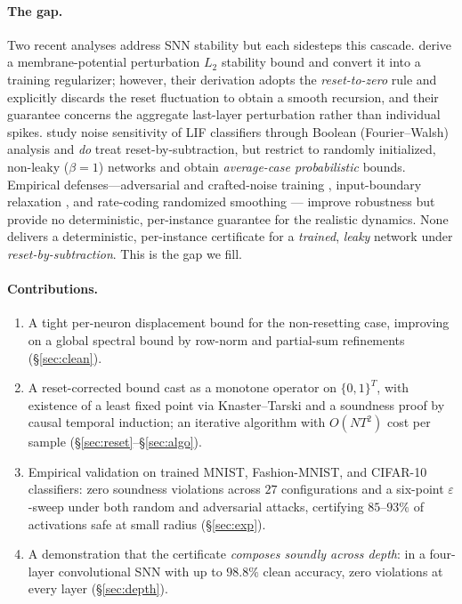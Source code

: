 \documentclass[10pt,twocolumn]{article}
\newcommand{\eps}{\varepsilon}
\begin{document}
\paragraph{The gap.} Two recent analyses address SNN stability but each sidesteps this
cascade. \citet{ding2024robust} derive a membrane-potential perturbation $L_2$ stability
bound and convert it into a training regularizer; however, their derivation adopts the
\emph{reset-to-zero} rule and explicitly discards the reset fluctuation to obtain a smooth
recursion, and their guarantee concerns the aggregate last-layer perturbation rather than
individual spikes. \citet{araya2025random} study noise sensitivity of LIF classifiers
through Boolean (Fourier--Walsh) analysis \citep{odonnell2014analysis} and \emph{do} treat
reset-by-subtraction, but restrict to randomly initialized, non-leaky ($\beta{=}1$) networks
and obtain \emph{average-case probabilistic} bounds. Empirical defenses---adversarial and
crafted-noise training \citep{kundu2021hire,sharmin2020inherent}, input-boundary relaxation
\citep{liang2022toward}, and rate-coding randomized smoothing \citep{mukhoty2024certified}---
improve robustness but provide no deterministic, per-instance guarantee for the realistic
dynamics. None delivers a deterministic, per-instance certificate for a \emph{trained},
\emph{leaky} network under \emph{reset-by-subtraction}. This is the gap we fill.

\paragraph{Contributions.}
\begin{enumerate}[leftmargin=1.4em,itemsep=1pt,topsep=2pt]
\item A tight per-neuron displacement bound for the non-resetting case, improving on a
global spectral bound by row-norm and partial-sum refinements (\S\ref{sec:clean}).
\item A reset-corrected bound cast as a monotone operator on $\{0,1\}^T$, with existence of a
least fixed point via Knaster--Tarski \citep{knaster1928theoreme,tarski1955lattice} and a
soundness proof by causal temporal induction; an iterative algorithm with $O(NT^2)$ cost per
sample (\S\ref{sec:reset}--\S\ref{sec:algo}).
\item Empirical validation on trained MNIST, Fashion-MNIST, and CIFAR-10 classifiers: zero
soundness violations across $27$ configurations and a six-point $\eps$-sweep under both random
and adversarial attacks, certifying $85$--$93\%$ of activations safe at small radius
(\S\ref{sec:exp}).
\item A demonstration that the certificate \emph{composes soundly across depth}: in a
four-layer convolutional SNN with up to $98.8\%$ clean accuracy, zero violations at every
layer (\S\ref{sec:depth}).
\end{enumerate}
\end{document}
